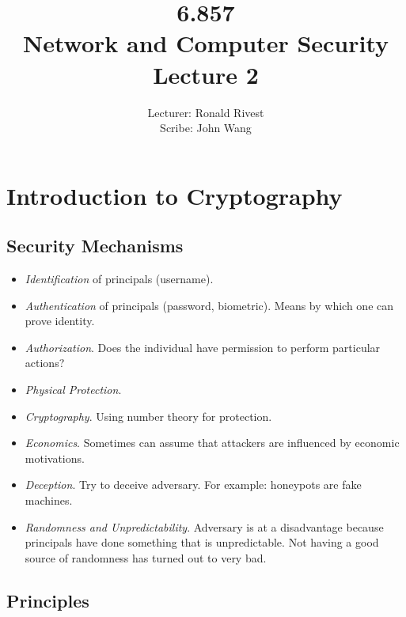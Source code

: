 \documentclass[psamsfonts]{amsart}
\title{6.857 \\
Network and Computer Security \\
Lecture 2}
\author{Lecturer: Ronald Rivest\\
Scribe: John Wang}
\begin{document}
\maketitle

\section{Introduction to Cryptography}

\subsection{Security Mechanisms}

\begin{itemize}
\item \emph{Identification} of principals (username).
\item \emph{Authentication} of principals (password, biometric). Means by which one can prove identity.
\item \emph{Authorization}. Does the individual have permission to perform particular actions?
\item \emph{Physical Protection}. 
\item \emph{Cryptography}. Using number theory for protection.
\item \emph{Economics}. Sometimes can assume that attackers are influenced by economic motivations.
\item \emph{Deception}. Try to deceive adversary. For example: honeypots are fake machines.
\item \emph{Randomness and Unpredictability}. Adversary is at a disadvantage because principals have done something that is unpredictable. Not having a good source of randomness has turned out to very bad.
\end{itemize}

\subsection{Principles}
\end{document}
